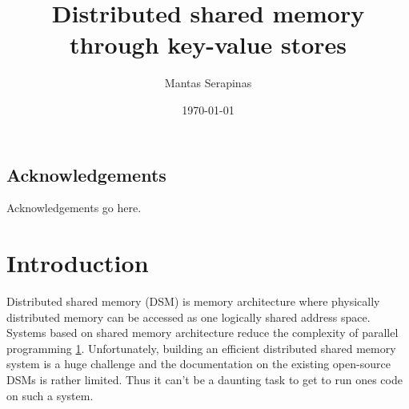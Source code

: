 \documentclass[bsc,frontabs,twoside,singlespacing,parskip,deptreport]{infthesis}     %
\begin{document}
\title{Distributed shared memory through key-value stores}

\author{Mantas Serapinas}



\date{\today}


\maketitle

\section*{Acknowledgements}
Acknowledgements go here. 

\tableofcontents



\chapter{Introduction}

Distributed shared memory (DSM) is memory architecture where physically distributed memory can be accessed as one logically shared address space. Systems based on shared memory architecture reduce the complexity of parallel programming \ref{}. Unfortunately, building an efficient distributed shared memory system is a huge challenge and the documentation on the existing open-source DSMs is rather limited. Thus it can't be a daunting task to get to run ones code on such a system. 
\end{document}
